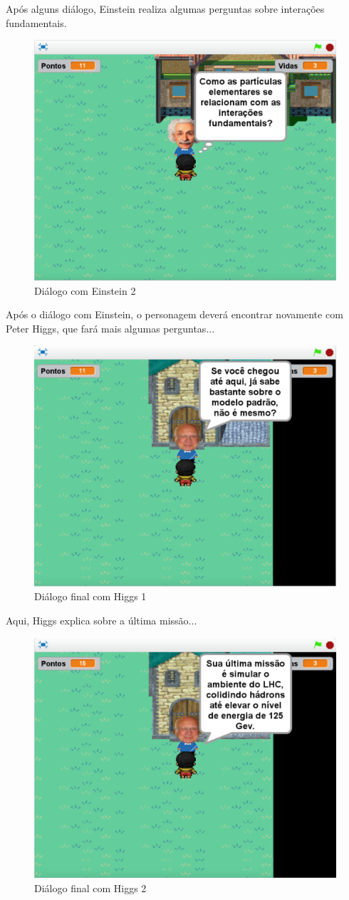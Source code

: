 \documentclass[12pt,fleqn]{book} %
\begin{document}
Após alguns diálogo, Einstein realiza algumas perguntas sobre interações fundamentais.

\begin{figure}[h]
	\centering
	\includegraphics[width=0.65 \textwidth]{Produto/jogo_16}
	\caption{Diálogo com Einstein 2}
	\label{fig:app_a:jogo16}
\end{figure}

\newpage

Após o diálogo com Einstein, o personagem deverá encontrar novamente com Peter Higgs, que fará mais algumas perguntas...

\begin{figure}[h]
	\centering
	\includegraphics[width=0.65 \textwidth]{Produto/jogo_17}
	\caption{Diálogo final com Higgs 1}
	\label{fig:app_a:jogo17}
\end{figure}

Aqui, Higgs explica sobre a última missão...

\begin{figure}[h]
	\centering
	\includegraphics[width=0.65 \textwidth]{Produto/jogo_18}
	\caption{Diálogo final com Higgs 2}
	\label{fig:app_a:jogo18}
\end{figure}
\end{document}
